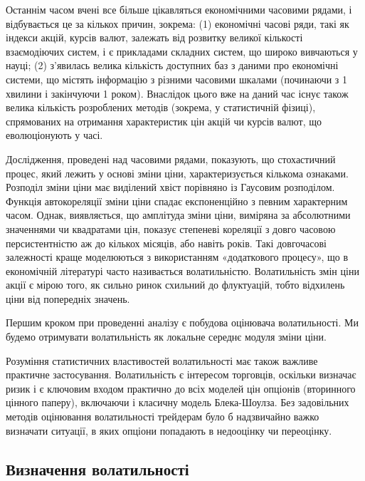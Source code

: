 \documentclass[
  letterpaper,
]{report}
\begin{document}
Останнім часом вчені все більше цікавляться економічними часовими
рядами, і відбувається це за кількох причин, зокрема: (1) економічні
часові ряди, такі як індекси акцій, курсів валют, залежать від розвитку
великої кількості взаємодіючих систем, і є прикладами складних систем,
що широко вивчаються у науці; (2) з'явилась велика кількість доступних
баз з даними про економічні системи, що містять інформацію з різними
часовими шкалами (починаючи з 1 хвилини і закінчуючи 1 роком). Внаслідок
цього вже на даний час існує також велика кількість розроблених методів
(зокрема, у статистичній фізиці), спрямованих на отримання характеристик
цін акцій чи курсів валют, що еволюціонують у часі.

Дослідження, проведені над часовими рядами, показують, що стохастичний
процес, який лежить у основі зміни ціни, характеризується кількома
ознаками. Розподіл зміни ціни має виділений хвіст порівняно із Гаусовим
розподілом. Функція автокореляції зміни ціни спадає експоненційно з
певним характерним часом. Однак, виявляється, що амплітуда зміни ціни,
виміряна за абсолютними значеннями чи квадратами цін, показує степеневі
кореляції з довго часовою персистентністю аж до кількох місяців, або
навіть років. Такі довгочасові залежності краще моделюються з
використанням «додаткового процесу», що в економічній літературі часто
називається волатильністю. Волатильність змін ціни акції є мірою того,
як сильно ринок схильний до флуктуацій, тобто відхилень ціни від
попередніх значень.

Першим кроком при проведенні аналізу є побудова оцінювача волатильності.
Ми будемо отримувати волатильність як локальне середнє модуля зміни
ціни.

Розуміння статистичних властивостей волатильності має також важливе
практичне застосування. Волатильність є інтересом торговців, оскільки
визначає ризик і є ключовим входом практично до всіх моделей цін
опціонів (вторинного цінного паперу), включаючи і класичну модель
Блека-Шоулза. Без задовільних методів оцінювання волатильності трейдерам
було б надзвичайно важко визначати ситуації, в яких опціони попадають в
недооцінку чи переоцінку.

\hypertarget{ux432ux438ux437ux43dux430ux447ux435ux43dux43dux44f-ux432ux43eux43bux430ux442ux438ux43bux44cux43dux43eux441ux442ux456}{%
\subsection{Визначення
волатильності}\label{ux432ux438ux437ux43dux430ux447ux435ux43dux43dux44f-ux432ux43eux43bux430ux442ux438ux43bux44cux43dux43eux441ux442ux456}}
\end{document}
